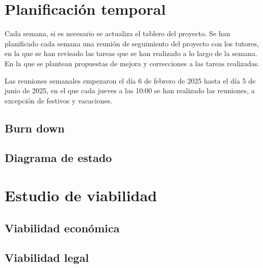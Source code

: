 \section{Planificación temporal}
Cada semana, si es necesario se actualiza el tablero del proyecto.
Se han planificado cada semana una reunión de seguimiento del proyecto con los tutores, en la que se han revisado las tareas que se han realizado a lo largo de la semana. En la que se plantean propuestas de mejora y correcciones a las tareas realizadas.

Las reuniones semanales empezaron el día 6 de febrero de 2025 hasta el día 5 de junio de 2025, en el que cada jueves a las 10:00 se han realizado las reuniones, a excepción de festivos y vacaciones.

\subsection{Burn down}

\subsection{Diagrama de estado}

\subsecciones

\section{Estudio de viabilidad}

\subsection{Viabilidad económica}

\subsection{Viabilidad legal}


